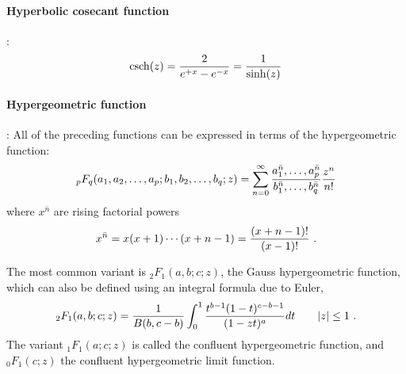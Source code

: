 \paragraph*{Hyperbolic cosecant function}\hspace{-0.8em}:
\[
\operatorname{csch}(z) = \frac{2}{e^{+x} - e^{-x} } = \frac{1}{\sinh(z)} \notag 
\]


\paragraph*{Hypergeometric function}\hspace{-0.8em}\cite{Abramowitz1965,Graham1994}: All of the preceding functions can be expressed in terms of the hypergeometric function:
\[
{}_p F_q (a_1, a_2, \ldots, a_p ; b_1, b_2, \ldots, b_q; z) = \sum_{n=0}^{\infty} \frac{a_1^{\bar{n}},\ldots,a_p^{\bar{n}}} {b_1^{\bar{n}},\ldots,b_q^{\bar{n}}}  \frac{z^n}{n!} 
\notag
\]
where $x^{\bar{n}}$ are rising factorial powers~\cite{Abramowitz1965, Graham1994}
\[
x^{\bar{n}} = x (x+1) \cdots (x+n-1) = \frac{ (x+n-1)!} {(x-1)!}  \ .	
\notag
\]

The most common variant is ${}_2 F_1 (a,b;c;z)$, the Gauss hypergeometric function, which can also be defined using an integral formula due to Euler, 
\[
{}_2 F_1 (a,b;c;z) = \frac{1}{B(b,c-b)} \int_0^1 \frac{t^{b-1} (1-t)^{c-b-1} }{ (1- z t)^a } dt \qquad |z|\leq 1
\checked
\ .
\notag
\]
The variant ${}_1 F_1 (a;c;z)$ is called the confluent hypergeometric function,
and ${}_0 F_1 (c;z)$ the confluent hypergeometric limit function.



